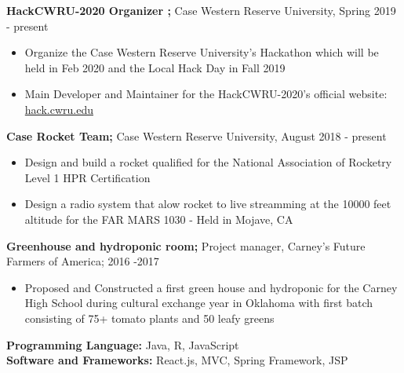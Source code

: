\documentclass[a4paper,11pt]{article}
\begin{document}
\begin{flushleft}
	
	\textbf{HackCWRU-2020 Organizer ; } Case Western Reserve University, Spring 2019 - 
	present
	\vspace{-\topsep}
	\begin{itemize}
		\setlength{\parskip}{0pt}
		\setlength{\itemsep}{0pt plus 1pt}
		\item Organize the Case Western Reserve University's Hackathon which will be held in Feb 2020 and the Local Hack Day in Fall 2019 \\
		\item Main Developer and Maintainer for the HackCWRU-2020's official website: \href{http://hack.cwru.edu}{hack.cwru.edu}
	\end{itemize}

	\textbf{Case Rocket Team; } Case Western Reserve University, August 2018 - present
	\vspace{-\topsep}
	\begin{itemize}
		\setlength{\parskip}{0pt}
		\setlength{\itemsep}{0pt plus 1pt}
		\item Design and build a rocket qualified for the National Association of Rocketry Level 1 HPR Certification
		\item Design a radio system that alow rocket to live streamming at the 10000 feet altitude for the FAR MARS 1030 - Held in Mojave, CA 
	\end{itemize}
	
	\textbf{Greenhouse and hydroponic room; }Project manager, Carney's Future Farmers of America; 2016 -2017
	\vspace{-\topsep}
	\begin{itemize}
		\setlength{\parskip}{0pt}
		\setlength{\itemsep}{0pt plus 1pt}
		\item Proposed and Constructed a first green house and hydroponic for the Carney High School during cultural exchange year in Oklahoma with first batch consisting of 75+ tomato plants and 50 leafy greens 
	\end{itemize}
\vspace{-\topsep}
\centering{\noindent\makebox{\rule{8cm}{1.5pt}}}
\end{flushleft} 

\begin{flushleft}
	\textbf{Programming Language:} Java, R, JavaScript \\ 
	\doublespacing
	\textbf{Software and Frameworks:} React.js, MVC, Spring Framework, JSP \\
\vspace{-\topsep}
\centering{\noindent\makebox{\rule{8cm}{1.5pt}}}
\end{flushleft}
\end{document}

